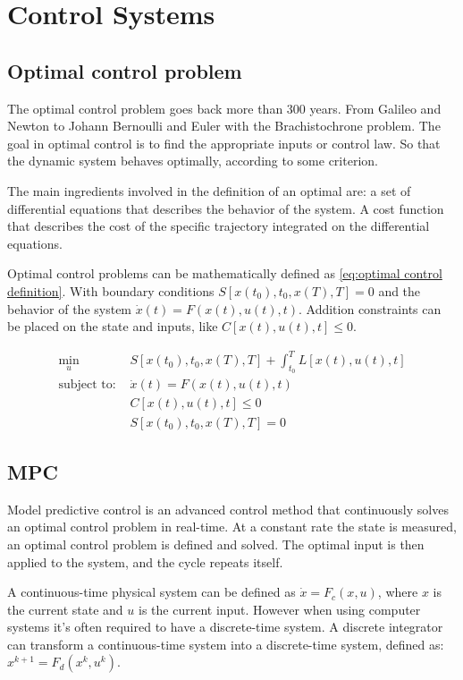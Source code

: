 \chapter{Control Systems}
\section{Optimal control problem}
	The optimal control problem goes back more than 300 years. From Galileo and Newton to Johann Bernoulli and Euler with the Brachistochrone problem. The goal in optimal control is to find the appropriate inputs or control law. So that the dynamic system behaves optimally, according to some criterion. 
	
	The main ingredients involved in the definition of an optimal are: a set of differential equations that describes the behavior of the system. A cost function that describes the cost of the specific trajectory integrated on the differential equations.
	
	Optimal control problems can be mathematically defined as \eqref{eq:optimal control definition}. With boundary conditions $S[x(t_0),t_0,x(T),T]=0$ and the behavior of the system $ \dot{x}(t) = F(x(t),u(t),t)$. Addition constraints can be placed on the state and inputs, like $C[x(t),u(t),t]\le 0$. 
	
	\begin{equation}
		\begin{aligned}
			\min_u \ & S[x(t_0),t_0,x(T),T] + \int_{t_0}^{T} L[x(t),u(t),t] \\ 
			\text{subject to: } & \dot{x}(t) = F(x(t),u(t),t) \\
			& C[x(t),u(t),t]\le 0 \\
			& S[x(t_0),t_0,x(T),T]=0
		\end{aligned}
		\label{eq:optimal control definition}
	\end{equation}

\section{MPC}
	Model predictive control is an advanced control method that continuously solves an  optimal control problem in real-time. At a constant rate the state is measured, an optimal control problem is defined and solved. The  optimal input is then applied to the system, and the cycle repeats itself.
	
	A continuous-time physical system can be defined as $\dot{x}=F_c(x,u)$, where $x$ is the current state and $u$ is the current input. However when using computer systems it's often required to have a discrete-time system. A discrete integrator can transform a continuous-time system into a discrete-time system, defined as: $x^{k+1}=F_d(x^{k},u^{k})$. 
	
